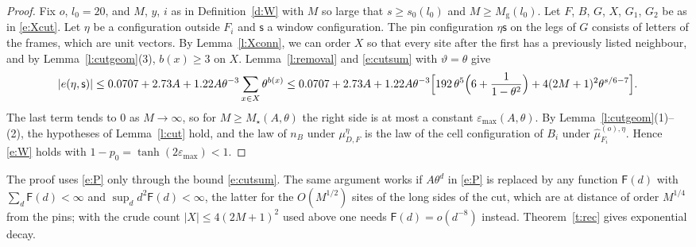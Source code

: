 \begin{proof}
Fix $o$, $l_0 = 20$, and $M$, $y$, $i$ as in Definition~\ref{d:W} with $M$ so large that $s \ge s_0(l_0)$ and $M \ge M_{\mathrm g}(l_0)$. Let $F$, $B$, $G$, $X$, $G_1$, $G_2$ be as in \eqref{e:Xcut}. Let $\eta$ be a configuration outside $F_i$ and $\mathsf s$ a window configuration. The pin configuration $\eta \mathsf s$ on the legs of $G$ consists of letters of the frames, which are unit vectors. By Lemma~\ref{l:Xconn}, we can order $X$ so that every site after the first has a previously listed neighbour, and by Lemma~\ref{l:cutgeom}(3), $b(x) \ge 3$ on $X$. Lemma~\ref{l:removal} and \eqref{e:cutsum} with $\vartheta = \theta$ give
\begin{equation*}
|e(\eta, \mathsf s)| \le 0.0707 + 2.73 A + 1.22 A \theta^{-3} \sum_{x \in X} \theta^{b(x)} \le 0.0707 + 2.73 A + 1.22 A \theta^{-3} \Bigl[ 192 \, \theta^{5} \Bigl( 6 + \frac{1}{1 - \theta^2} \Bigr) + 4 (2M + 1)^2 \theta^{s/6 - 7} \Bigr].
\end{equation*}
The last term tends to $0$ as $M \to \infty$, so for $M \ge M_\star(A, \theta)$ the right side is at most a constant $\varepsilon_{\max}(A, \theta)$. By Lemma~\ref{l:cutgeom}(1)--(2), the hypotheses of Lemma~\ref{l:cut} hold, and the law of $n_B$ under $\mu^\eta_{D, F}$ is the law of the cell configuration of $B_i$ under $\hat\mu^{(o), \eta}_{F_i}$. Hence \eqref{e:W} holds with $1 - p_0 = \tanh(2 \varepsilon_{\max}) < 1$.
\end{proof}

\begin{remark}\label{r:Pweak}
The proof uses \eqref{e:P} only through the bound \eqref{e:cutsum}. The same argument works if $A \theta^d$ in \eqref{e:P} is replaced by any function $\mathsf F(d)$ with $\sum_d \mathsf F(d) < \infty$ and $\sup_d d^2 \mathsf F(d) < \infty$, the latter for the $O(M^{1/2})$ sites of the long sides of the cut, which are at distance of order $M^{1/4}$ from the pins; with the crude count $|X| \le 4(2M + 1)^2$ used above one needs $\mathsf F(d) = o(d^{-8})$ instead. Theorem~\ref{t:rec} gives exponential decay.
\end{remark}
